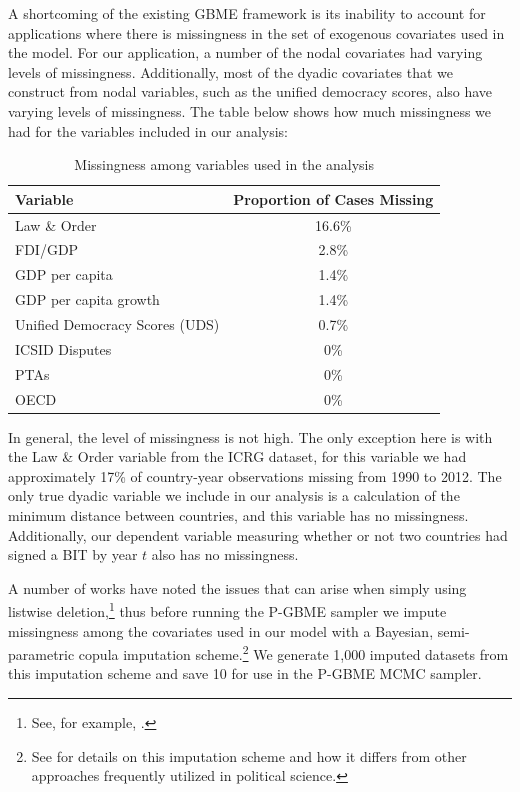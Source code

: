 \documentclass[a4paper, 12pt]{article}
\begin{document}
A shortcoming of the existing GBME framework is its inability to account for applications where there is missingness in the set of exogenous covariates used in the model. For our application, a number of the nodal covariates had varying levels of missingness. Additionally, most of the dyadic covariates that we construct from nodal variables, such as the unified democracy scores, also have varying levels of missingness. The table below shows how much missingness we had for the variables included in our analysis: 

\begin{table}[ht]
  \centering
  \caption{Missingness among variables used in the analysis}
  \begin{tabular}{lc}
  \toprule
  Variable & Proportion of Cases Missing \\
    \midrule
    Law \& Order & 16.6\% \\ 
    FDI/GDP & 2.8\% \\
    GDP per capita & 1.4\% \\
    GDP per capita growth & 1.4\% \\
    Unified Democracy Scores (UDS) & 0.7\% \\
    ICSID Disputes & 0\% \\
    PTAs & 0\% \\   
    OECD & 0\% \\
    \bottomrule
  \end{tabular}
\end{table}
\FloatBarrier

In general, the level of missingness is not high. The only exception here is with the Law \& Order variable from the ICRG dataset, for this variable we had approximately 17\% of country-year observations missing from 1990 to 2012. The only true dyadic variable we include in our analysis is a calculation of the minimum distance between countries, and this variable has no missingness. Additionally, our dependent variable measuring whether or not two countries had signed a BIT by year $t$ also has no missingness. 

A number of works have noted the issues that can arise when simply using listwise deletion,\footnote{See, for example, \citet{king:etal:2001}.} thus before running the P-GBME sampler we impute missingness among the covariates used in our model with a Bayesian, semi-parametric copula imputation scheme.\footnote{See \citet{hoff:2007a,hollenbach:etal:2016a} for details on this imputation scheme and how it differs from other approaches frequently utilized in political science.} We generate 1,000 imputed datasets from this imputation scheme and save 10 for use in the P-GBME MCMC sampler.
\end{document}
